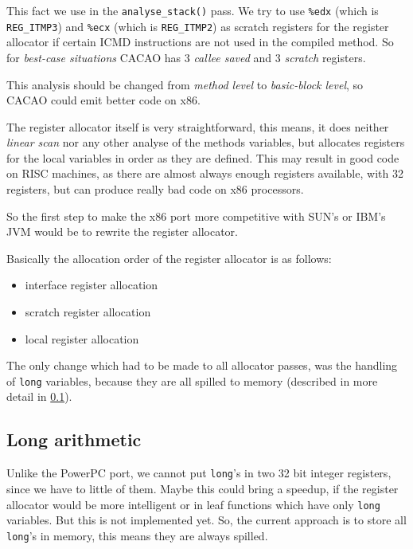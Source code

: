 This fact we use in the \texttt{analyse\_stack()} pass. We try to use
\texttt{\%edx} (which is \texttt{REG\_ITMP3}) and \texttt{\%ecx} (which
is \texttt{REG\_ITMP2}) as scratch registers for the register
allocator if certain ICMD instructions are not used in the compiled
method. So for \textit{best-case situations} CACAO has 3
\textit{callee saved} and 3 \textit{scratch} registers.

This analysis should be changed from \textit{method level} to
\textit{basic-block level}, so CACAO could emit better code on x86.

The register allocator itself is very straightforward, this means, it
does neither \textit{linear scan} nor any other analyse of the methods
variables, but allocates registers for the local variables in order as
they are defined. This may result in good code on RISC machines, as
there are almost always enough registers available, with 32 registers,
but can produce really bad code on x86 processors.

So the first step to make the x86 port more competitive with SUN's or
IBM's JVM would be to rewrite the register allocator.

Basically the allocation order of the register allocator is as
follows:

\begin{itemize}
 \item interface register allocation
 \item scratch register allocation
 \item local register allocation
\end{itemize}

The only change which had to be made to all allocator passes, was the
handling of \texttt{long} variables, because they are all spilled to
memory (described in more detail in \ref{LongArithmetic}).


\subsection{Long arithmetic}\label{LongArithmetic}

Unlike the PowerPC port, we cannot put \texttt{long}'s in two 32 bit
integer registers, since we have to little of them. Maybe this could
bring a speedup, if the register allocator would be more intelligent
or in leaf functions which have only \texttt{long} variables. But this
is not implemented yet. So, the current approach is to store all
\texttt{long}'s in memory, this means they are always spilled.

